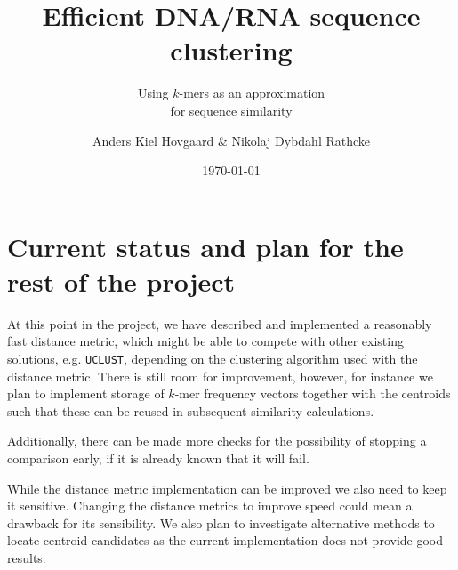 \documentclass[11pt, a4paper]{article}
\title{Efficient DNA/RNA sequence clustering}
\subtitle{Using $k$-mers as an approximation\\for sequence similarity}
\author{Anders Kiel Hovgaard \& Nikolaj Dybdahl Rathcke}
\date{\today}
\begin{document}
\begin{titlepage}
  \maketitle
\end{titlepage}


\thispagestyle{plain}
\newpage

\tableofcontents
\thispagestyle{plain}
\newpage

\thispagestyle{fancy}






\section{Current status and plan for the rest of the project}

At this point in the project, we have described and implemented a reasonably
fast distance metric, which might be able to compete with other existing
solutions, e.g. \texttt{UCLUST}, depending on the clustering algorithm used
with the distance metric. There is still room for improvement, however, for
instance we plan to implement storage of $k$-mer frequency vectors together
with the centroids such that these can be reused in subsequent similarity
calculations.

Additionally, there can be made more checks for the possibility of stopping a
comparison early, if it is already known that it will fail.

While the distance metric implementation can be improved we also need to keep
it sensitive. Changing the distance metrics to improve speed could mean a
drawback for its sensibility. We also plan to investigate alternative methods
to locate centroid candidates as the current implementation does not provide
good results.


\newpage

\end{document}

